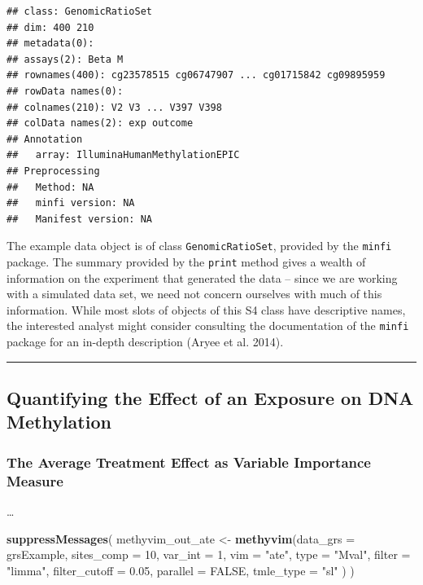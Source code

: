 \documentclass[9pt,a4paper,]{extarticle}
\newenvironment{Shaded}{\begin{snugshade}}{\end{snugshade}}
\newcommand{\KeywordTok}[1]{\textcolor[rgb]{0.13,0.29,0.53}{\textbf{#1}}}
\newcommand{\DataTypeTok}[1]{\textcolor[rgb]{0.13,0.29,0.53}{#1}}
\newcommand{\DecValTok}[1]{\textcolor[rgb]{0.00,0.00,0.81}{#1}}
\newcommand{\FloatTok}[1]{\textcolor[rgb]{0.00,0.00,0.81}{#1}}
\newcommand{\StringTok}[1]{\textcolor[rgb]{0.31,0.60,0.02}{#1}}
\newcommand{\OtherTok}[1]{\textcolor[rgb]{0.56,0.35,0.01}{#1}}
\newcommand{\NormalTok}[1]{#1}
\theoremstyle{definition}
\theoremstyle{definition}
\theoremstyle{definition}
\theoremstyle{remark}
\begin{document}
\begin{verbatim}
## class: GenomicRatioSet 
## dim: 400 210 
## metadata(0):
## assays(2): Beta M
## rownames(400): cg23578515 cg06747907 ... cg01715842 cg09895959
## rowData names(0):
## colnames(210): V2 V3 ... V397 V398
## colData names(2): exp outcome
## Annotation
##   array: IlluminaHumanMethylationEPIC
## Preprocessing
##   Method: NA
##   minfi version: NA
##   Manifest version: NA
\end{verbatim}

The example data object is of class \texttt{GenomicRatioSet}, provided
by the \texttt{minfi} package. The summary provided by the
\texttt{print} method gives a wealth of information on the experiment
that generated the data -- since we are working with a simulated data
set, we need not concern ourselves with much of this information. While
most slots of objects of this S4 class have descriptive names, the
interested analyst might consider consulting the documentation of the
\texttt{minfi} package for an in-depth description (Aryee et al. 2014).

\begin{center}\rule{0.5\linewidth}{\linethickness}\end{center}

\subsection{Quantifying the Effect of an Exposure on DNA
Methylation}\label{quantifying-the-effect-of-an-exposure-on-dna-methylation}

\subsubsection{The Average Treatment Effect as Variable Importance
Measure}\label{the-average-treatment-effect-as-variable-importance-measure}

\ldots{}

\begin{Shaded}
\begin{Highlighting}[]
\KeywordTok{suppressMessages}\NormalTok{(}
\NormalTok{  methyvim_out_ate <-}\StringTok{ }\KeywordTok{methyvim}\NormalTok{(}\DataTypeTok{data_grs =}\NormalTok{ grsExample, }\DataTypeTok{sites_comp =} \DecValTok{10}\NormalTok{,}
                               \DataTypeTok{var_int =} \DecValTok{1}\NormalTok{, }\DataTypeTok{vim =} \StringTok{"ate"}\NormalTok{, }\DataTypeTok{type =} \StringTok{"Mval"}\NormalTok{,}
                               \DataTypeTok{filter =} \StringTok{"limma"}\NormalTok{, }\DataTypeTok{filter_cutoff =} \FloatTok{0.05}\NormalTok{,}
                               \DataTypeTok{parallel =} \OtherTok{FALSE}\NormalTok{, }\DataTypeTok{tmle_type =} \StringTok{"sl"}
\NormalTok{                              )}
\NormalTok{)}
\end{Highlighting}
\end{Shaded}
\end{document}
